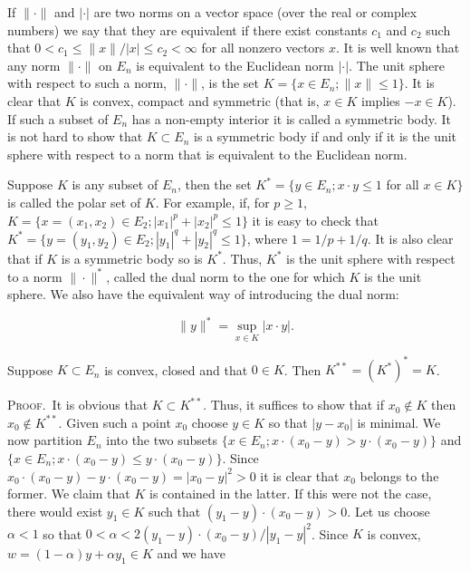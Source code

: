 If $\|\cdot\|$ and $|\cdot|$ are two norms on a vector space (over the real or complex numbers) we say that they are equivalent if there exist constants $c_1$ and $c_2$ such that $0 < c_1 \leq \|x\|/|x| \leq c_2 < \infty$ for all nonzero vectors $x$. It is well known that any norm $\|\cdot\|$ on $E_n$ is equivalent to the Euclidean norm $|\cdot|$. The unit sphere with respect to such a norm, $\|\cdot\|$, is the set $K = \{x \in E_n; \|x\| \leq 1\}$. It is clear that $K$ is convex, compact and symmetric (that is, $x \in K$ implies $-x \in K$). If such a subset of $E_n$ has a non-empty interior it is called a symmetric body. It is not hard to show that $K \subset E_n$ is a symmetric body if and only if it is the unit sphere with respect to a norm that is equivalent to the Euclidean norm.

Suppose $K$ is any subset of $E_n$, then the set $K^* = \{y \in E_n; x \cdot y \leq 1$ for all $x \in K\}$ is called the polar set of $K$. For example, if, for $p \geq 1$, $K = \{x = (x_1, x_2) \in E_2; |x_1|^p + |x_2|^p \leq 1\}$ it is easy to check that $K^* = \{y = (y_1, y_2) \in E_2; |y_1|^q + |y_2|^q \leq 1\}$, where $1 = 1/p + 1/q$. It is also clear that if $K$ is a symmetric body so is $K^*$. Thus, $K^*$ is the unit sphere with respect to a norm $\|\cdot\|^*$, called the dual norm to the one for which $K$ is the unit sphere. We also have the equivalent way of introducing the dual norm:

\begin{equation}\label{eq:c3-4-6}
\|y\|^{*}=\sup_{x\in K}|x\cdot y|.
\end{equation}

\begin{lemma}
\label{lem:c3-4-7}
Suppose $K \subset E_n$ is convex, closed and that $0 \in K$. Then $K^{**} = (K^*)^* = K$.
\end{lemma}

\textsc{Proof.}\ It is obvious that $K \subset K^{**}$. Thus, it suffices to show that if $x_0 \notin K$ then $x_0 \notin K^{**}$. Given such a point $x_0$ choose $y \in K$ so that $|y - x_0|$ is minimal. We now partition $E_n$ into the two subsets $\{x \in E_n; x \cdot (x_0 - y) > y \cdot (x_0 - y)\}$ and $\{x \in E_n; x \cdot (x_0 - y) \leq y \cdot (x_0 - y)\}$. Since $x_0 \cdot (x_0 - y) - y \cdot (x_0 - y) = |x_0 - y|^2 > 0$ it is clear that $x_0$ belongs to the former. We claim that $K$ is contained in the latter. If this were not the case, there would exist $y_1 \in K$ such that $(y_1 - y) \cdot (x_0 - y) > 0$. Let us choose $\alpha < 1$ so that $0 < \alpha < 2(y_1 - y) \cdot (x_0 - y)/|y_1 - y|^2$. Since $K$ is convex, $w = (1 - \alpha)y + \alpha y_1 \in K$ and we have

